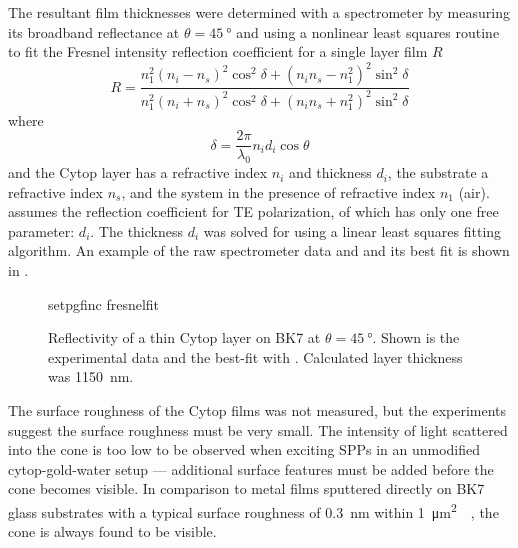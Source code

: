 The resultant film thicknesses were determined with a spectrometer by
measuring its broadband reflectance at $\theta=\SI{45}{\degree}$ and using
a nonlinear least squares routine~\cite{more1977LevAlgImpThe_2} to 
fit the Fresnel intensity reflection coefficient for a single layer
film $R$~\cite{steck2006classical} 
\begin{equation}
				R = \frac{n_1^2{(n_i-n_s)}^2 \cos^2\delta + {(n_i n_s - n_1^2)}^2\sin^2\delta}
				{n_1^2{(n_i+n_s)}^2 \cos^2\delta + {(n_i n_s + n_1^2)}^2\sin^2\delta}
          \label{eqn:fitfresnel}
\end{equation}
where
\begin{equation}
 \delta = \frac{2\pi}{\lambda_0} n_i d_i \cos \theta
\end{equation}
and the Cytop layer has a refractive index $n_i$ and thickness $d_i$, the
substrate a refractive index $n_s$, and the system in the presence of
refractive index $n_1$ (air).   assumes the
reflection coefficient for TE polarization, of which 
has only one free parameter: $d_i$.  The thickness $d_i$ was solved for using
a linear least squares fitting algorithm.  An example of the raw spectrometer
data and and its best fit is shown in
.

\begin{figure}
 \centering
 {setpgfinc}
 {fresnelfit}
 \caption{Reflectivity of a thin Cytop layer on BK7 at
 $\theta=\SI{45}{\degree}$.  Shown is the experimental data and the
	best-fit with .  Calculated layer thickness was \SI{1150}{\nano\meter}.}
\label{fig:fresnelfit}
\end{figure}

The surface roughness of the Cytop films was not measured, but the experiments
suggest the surface roughness must be very small.  The intensity of light
scattered into the cone is too low to be observed when exciting SPPs in an
unmodified cytop-gold-water setup --- additional surface features must be
added before the cone becomes visible.  In comparison to metal films sputtered
directly on BK7 glass substrates with a typical surface roughness of
\SI{0.3}{\nano\meter} within
\SI{1}{\micro\meter\squared}~\cite{cheang2011study}~\cite{chiu2011optimizing},
the cone is always found to be visible.  
